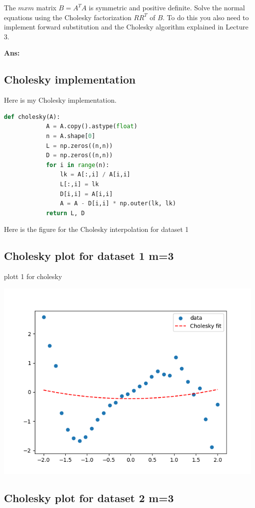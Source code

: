 \documentclass[11pt]{article}
\newenvironment{solbox}
  {\begin{mdframed}[linewidth=1pt,linecolor=black,roundcorner=5pt]
   \noindent\textbf{Ans: }\enspace}
  {\end{mdframed}}
\begin{document}
The $m x m$ matrix $B = A^T A$ is symmetric and positive definite. Solve the normal equations using the Cholesky factorization $RR^T$ of $B$. To do
this you also need to implement forward substitution and the Cholesky
algorithm explained in Lecture 3.


\begin{solbox}
    \subsection{Cholesky implementation}

    Here is my Cholesky implementation.



    \begin{lstlisting}[language=Python]
        def cholesky(A):
            A = A.copy().astype(float)
            n = A.shape[0]
            L = np.zeros((n,n))
            D = np.zeros((n,n))
            for i in range(n):
                lk = A[:,i] / A[i,i]
                L[:,i] = lk
                D[i,i] = A[i,i] 
                A = A - D[i,i] * np.outer(lk, lk)
            return L, D
    \end{lstlisting}

    Here is the figure for the Cholesky interpolation for dataset 1

    \subsection{Cholesky plot for dataset 1 m=3}


    plott 1 for cholesky
    \begin{center}
    \includegraphics[width=0.75\linewidth]{../Figures/M3Chol_plot_dataset1.png}
    \end{center}

    \subsection{Cholesky plot for dataset 2 m=3}


\end{solbox}
\end{document}
